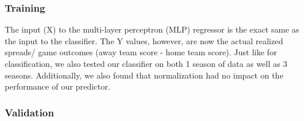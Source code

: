 \documentclass{article}
\begin{document}
\subsubsection{Training}
The input (X) to the multi-layer perceptron (MLP) regressor is the exact same as the input to the classifier. The Y values, however, are now the actual realized spreads/ game outcomes (away team score - home team score). Just like for classification, we also tested our classifier on both 1 season of data as well as 3 seasons. Additionally, we also found that normalization had no impact on the performance of our predictor.

\subsubsection{Validation}
\end{document}
